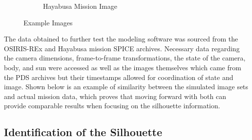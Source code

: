 \begin{figure}
\begin{subfigure}{0.23\textwidth}
         \caption{Hayabusa Mission Image}
         \label{fig:three sin x 2}
     \end{subfigure}
        \caption{Example Images}
        \label{fig:four_images}
\end{figure}
The data obtained to further test the modeling software was sourced from the OSIRIS-REx and Hayabusa mission SPICE archives. Necessary data regarding the camera dimensions, frame-to-frame transformations, the state of the camera, body, and sun were accessed as well as the images themselves which came from the PDS archives but their timestamps allowed for coordination of state and image. Shown below is an example of similarity between the simulated image sets and actual mission data, which proves that moving forward with both can provide comparable results when focusing on the silhouette information.



\subsection{Identification of the Silhouette}


